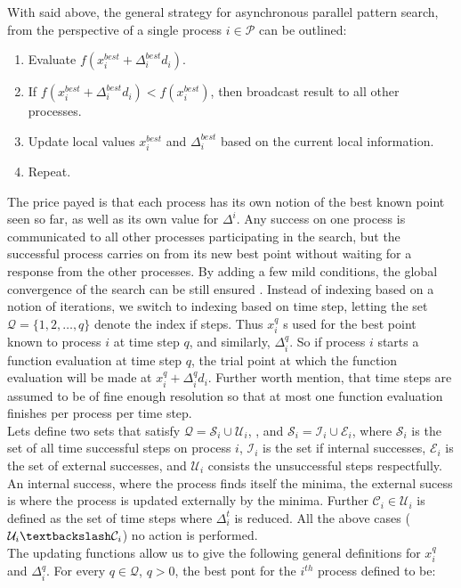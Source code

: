  With said above, the general strategy for asynchronous parallel pattern search, from the perspective of a single process $i\in\mathcal{P}$ can be outlined:
		\begin{enumerate}
		\item Evaluate $f(x^{best}_i+\Delta^{best}_id_i)$.
		\item If $f(x^{best}_i+\Delta^{best}_id_i) <f(x^{best}_i)$, then broadcast result to all other processes.
		\item Update local values $x^{best}_i$ and $\Delta^{best}_i$ based on the current local information.
		\item Repeat.
		\end{enumerate}
	The price payed is that each process has its own notion of the best known point seen so far, as well as its own value for	$\Delta^i$. Any success on one process is communicated to all other processes participating in the search, but the successful process carries on from its new best point without waiting for a response from the other processes. By adding a few mild conditions, the global convergence of the search can be still ensured \cite{}.  Instead of indexing based on a notion of iterations, we switch to indexing based on time step, letting the set $\mathcal{Q}=\{1,2,\dots,q\}$ denote the index if steps. Thus $x_i^q$ s used for the best point known to process $i$ at time step $q$, and similarly, $\Delta_i^q$.  So if process $i$ starts a function evaluation at time step $q$, the trial point at which the function evaluation will be made at $x^{q}_i+\Delta^{q}_id_i$. Further worth mention, that time steps are assumed to be of fine enough resolution so that at most one function evaluation finishes per process per time step.\\
	Lets define two sets that satisfy $\mathcal{Q}=\mathcal{S}_i\cup\mathcal{U}_i$, , and $\mathcal{S}_i=\mathcal{I}_i\cup\mathcal{E}_i$, where $\mathcal{S}_i$ is the set of all time successful steps on process $i$, $\mathcal{I}_i$ is the set if internal successes, $\mathcal{E}_i$ is the set of external successes,   and $\mathcal{U}_i$ consists the unsuccessful steps respectfully. An internal success, where the process finds itself the minima, the external sucess is where the process is updated externally by the minima. Further  $\mathcal{C}_i\in\mathcal{U}_i$ is defined as the set of time steps where $\Delta^t_i$ is reduced. All the above cases ($\mathcal{U}_i\textbackslash\mathcal{C}_i$) no action is performed.\\
	The updating functions allow us to give the following general definitions for $x_i^q$ and $\Delta^q_i$. For every $q\in\mathcal{Q}$, $q>0$, the best pont for the $i^{th}$ process defined to be:
	
